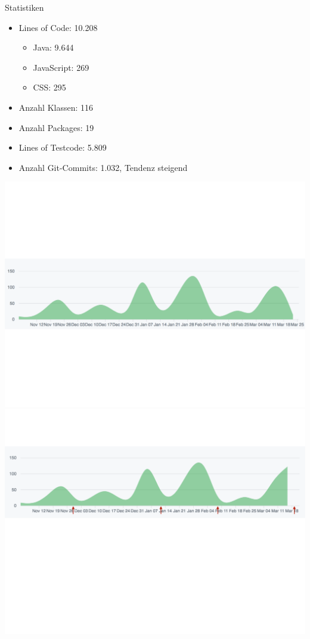 \documentclass[10pt]{beamer}
\begin{document}
\begin{frame}{Statistiken}{}
	\begin{itemize}
		\item Lines of Code: 10.208
		\begin{itemize}
			\item Java: 9.644
			\item JavaScript: 269
			\item CSS: 295
		\end{itemize}
		\item Anzahl Klassen: 116
		\item Anzahl Packages: 19
		\item Lines of Testcode: 5.809 
		\item Anzahl Git-Commits: 1.032, Tendenz steigend
	\end{itemize}
	
	\begin{overprint}
    \includegraphics[width = \textwidth]{img/GitCommits}
    \includegraphics[width = \textwidth]{img/GitCommitsWithApp}
    \end{overprint}
\end{frame}
\end{document}
